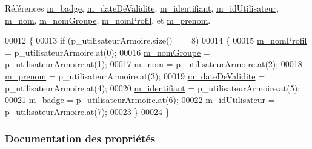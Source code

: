 Références \hyperlink{class_utilisateur_armoire_a1a3170a83da04d9f49816a98b226baeb}{m\+\_\+badge}, \hyperlink{class_utilisateur_armoire_a51bd81c78d69ea2699373d820bae31e4}{m\+\_\+date\+De\+Validite}, \hyperlink{class_utilisateur_armoire_a30cb02e16dd9085a70c6b436781bb756}{m\+\_\+identifiant}, \hyperlink{class_utilisateur_armoire_a7e3072a1a336d5ee1cf87c81d27b11e0}{m\+\_\+id\+Utilisateur}, \hyperlink{class_utilisateur_armoire_a39e1227fe3c7d726b161acab6a5c3434}{m\+\_\+nom}, \hyperlink{class_utilisateur_armoire_a6cf08d0dafdc9111d34f34a47c78b373}{m\+\_\+nom\+Groupe}, \hyperlink{class_utilisateur_armoire_a470f47c105d9b3124c8d284b164a443d}{m\+\_\+nom\+Profil}, et \hyperlink{class_utilisateur_armoire_a652d7a57ec09963d16ab82838a5ffc51}{m\+\_\+prenom}.


\begin{DoxyCode}
00012 \{
00013     \textcolor{keywordflow}{if} (p\_utilisateurArmoire.size() == 8)
00014     \{
00015         \hyperlink{class_utilisateur_armoire_a470f47c105d9b3124c8d284b164a443d}{m\_nomProfil} = p\_utilisateurArmoire.at(0);
00016         \hyperlink{class_utilisateur_armoire_a6cf08d0dafdc9111d34f34a47c78b373}{m\_nomGroupe} = p\_utilisateurArmoire.at(1);
00017         \hyperlink{class_utilisateur_armoire_a39e1227fe3c7d726b161acab6a5c3434}{m\_nom} = p\_utilisateurArmoire.at(2);
00018         \hyperlink{class_utilisateur_armoire_a652d7a57ec09963d16ab82838a5ffc51}{m\_prenom} = p\_utilisateurArmoire.at(3);
00019         \hyperlink{class_utilisateur_armoire_a51bd81c78d69ea2699373d820bae31e4}{m\_dateDeValidite} = p\_utilisateurArmoire.at(4);
00020         \hyperlink{class_utilisateur_armoire_a30cb02e16dd9085a70c6b436781bb756}{m\_identifiant} = p\_utilisateurArmoire.at(5);
00021         \hyperlink{class_utilisateur_armoire_a1a3170a83da04d9f49816a98b226baeb}{m\_badge} = p\_utilisateurArmoire.at(6);
00022         \hyperlink{class_utilisateur_armoire_a7e3072a1a336d5ee1cf87c81d27b11e0}{m\_idUtilisateur} = p\_utilisateurArmoire.at(7);
00023     \}
00024 \}
\end{DoxyCode}


\subsubsection{Documentation des propriétés}
\mbox{\label{class_utilisateur_armoire_a1a3170a83da04d9f49816a98b226baeb}} 

